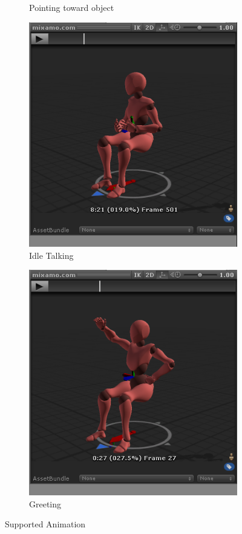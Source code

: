 \documentclass[18pt]{article}
\numberwithin{equation}{section} %
\numberwithin{figure}{section} %
\numberwithin{table}{section} %
\begin{document}
\begin{figure}[H]
\begin{subfigure}{0.2\textwidth}
					\caption{Pointing toward object}
				\end{subfigure}		
				\begin{subfigure}{0.2\textwidth}
					\centering
					\includegraphics[width=0.96\linewidth]{images/sit_talk}
					\caption{Idle Talking}
				\end{subfigure}
				\begin{subfigure}{0.2\textwidth}
					\centering
					\includegraphics[width=0.96\linewidth]{images/sit_wave}
					\caption{Greeting}
				\end{subfigure}				
				\caption{Supported Animation}
				\label{fig:animat}
			\end{figure}
			
\end{document}
